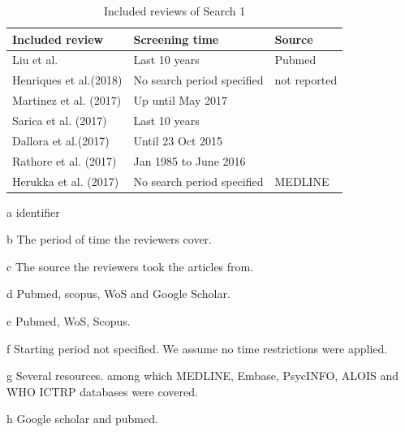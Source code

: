 \begin{table}[h]
	\centering
	\begin{threeparttable}
		\caption{Included reviews of Search 1}
		\label{whatever}	
		\begin{tabular}{lll}
			\toprule
			\textbf{Included review\tnote{a}} & \textbf{Screening time\tnote{b}} & \textbf{Source\tnote{c}}\\
			\midrule
			Liu et al.\cite{Liu201856} & Last 10 years & Pubmed \\
			Henriques et al.(2018)\cite{Henriques2018} & No search period specified & not reported \\
			Martinez et al. (2017)\cite{Martinez2017} & Up until May 2017 & \tnote{g}\\
			Sarica et al. (2017)\cite{Sarica2017} & Last 10 years &  \tnote{d}\\
			Dallora et al.(2017)\cite{Dallora2017} & Until 23 Oct 2015\tnote{f} & \tnote{e}\\
			Rathore et al. (2017)\cite{Rathore2017530} & Jan 1985 to June 2016 & \tnote{h}\\
			Herukka et al. (2017)\cite{Herukka2017285}& No search period specified & MEDLINE \\
			\bottomrule
		\end{tabular}
		\scriptsize\begin{tablenotes} %
			\item[a]{identifier}
			\item[b]{The period of time the reviewers cover.}
			\item[c]{The source the reviewers took the articles from.}
			\item[d]{Pubmed, scopus, WoS and Google Scholar.}
			\item[e]{Pubmed, WoS, Scopus.}
			\item[f]{Starting period not specified. We assume no time restrictions were applied.}
			\item[g]{Several resources. among which MEDLINE, Embase, PsycINFO, ALOIS and WHO ICTRP databases were covered.}
			\item[h]{Google scholar and pubmed.}

		\end{tablenotes}
	\end{threeparttable}
	
	
	
	
	
\end{table}


